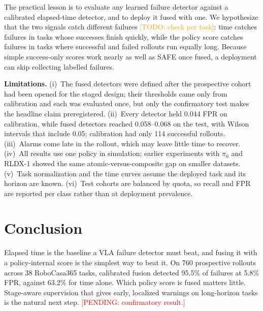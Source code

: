 \documentclass[conference,a4paper]{IEEEtran}
\newcommand{\pending}[1]{\textcolor{red}{[PENDING: #1]}}
\newcommand{\todo}[1]{\textcolor{orange}{[TODO: #1]}}
\begin{document}
The practical lesson is to evaluate any learned failure detector against a calibrated
elapsed-time detector, and to deploy it fused with one. We hypothesize that the two signals
catch different failures \todo{check per task}: time catches failures in tasks whose
successes finish quickly, while the policy score catches failures in tasks where successful
and failed rollouts run equally long. Because simple success-only scores work nearly as well
as SAFE once fused, a deployment can skip collecting labelled failures.

\textbf{Limitations.} (i)~The fused detectors were defined after the prospective cohort had
been opened for the staged design; their thresholds came only from calibration and each was
evaluated once, but only the confirmatory test makes the headline claim preregistered.
(ii)~Every detector held 0.044 FPR on calibration, while fused detectors reached 0.058--0.068
on the test, with Wilson intervals that include 0.05; calibration had only 114 successful
rollouts. (iii)~Alarms come late in the rollout, which may leave little time to recover.
(iv)~All results use one policy in simulation; earlier experiments with $\pi_0$ and RLDX-1
showed the same atomic-versus-composite gap on smaller datasets. (v)~Task normalization and
the time curves assume the deployed task and its horizon are known. (vi)~Test cohorts are
balanced by quota, so recall and FPR are reported per class rather than at deployment
prevalence.

\section{Conclusion}

Elapsed time is the baseline a VLA failure detector must beat, and fusing it with a
policy-internal score is the simplest way to beat it. On 760 prospective rollouts across 38
RoboCasa365 tasks, calibrated fusion detected 95.5\% of failures at 5.8\% FPR, against 63.2\%
for time alone. Which policy score is fused matters little. Stage-aware supervision that gives
early, localized warnings on long-horizon tasks is the natural next step.
\pending{confirmatory result.}



\end{document}
